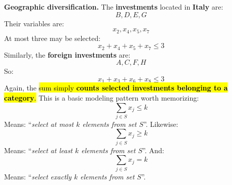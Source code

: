 \begin{examplebox}
    \highspace
    \textcolor{Green3}{ \textbf{Geographic diversification.}} The \textbf{investments} located in \textbf{Italy} are:
    \begin{equation*}
        B,D,E,G
    \end{equation*}
    Their variables are:
    \begin{equation*}
        x_2,x_4,x_5,x_7
    \end{equation*}
    At most three may be selected:
    \begin{equation*}
        \boxed{
            x_2+x_4+x_5+x_7\leq3
        }
    \end{equation*}
    Similarly, the \textbf{foreign investments} are:
    \begin{equation*}
        A,C,F,H
    \end{equation*}
    So:
    \begin{equation*}
        \boxed{
            x_1+x_3+x_6+x_8\leq3
        }
    \end{equation*}
    Again, the \hl{sum simply \textbf{counts selected investments belonging to a category}.} This is a basic modeling pattern worth memorizing:
    \begin{equation}
        \sum_{j\in S}x_j\leq k
    \end{equation}
    Means: ``\emph{select at most $k$ elements from set $S$}''. Likewise:
    \begin{equation*}
        \sum_{j\in S}x_j\geq k
    \end{equation*}
    Means: ``\emph{select at least $k$ elements from set $S$}''. And:
    \begin{equation*}
        \sum_{j\in S}x_j=k
    \end{equation*}
    Means: ``\emph{select exactly $k$ elements from set $S$}''.


\end{examplebox}
